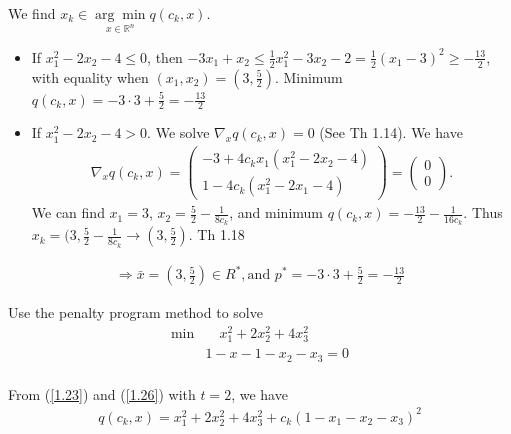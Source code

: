 We find $x_k\in\underset{x\in\mathbb{R}^n}{\arg\min} q(c_k, x)$.
\begin{itemize}
    \item If $x_1^2 - 2x_2 - 4\leqslant 0$, then $-3x_1 + x_2 \leqslant \frac{1}{2}x_1^2 - 3x_2 - 2 = \frac{1}{2}\left(x_1 - 3\right)^2\geqslant -\frac{13}{2}$, with equality when $(x_1, x_2) = (3, \frac{5}{2})$. Minimum $q(c_k, x) = -3\cdot 3 + \frac{5}{2} = -\frac{13}{2}$
    \item If $x_1^2 - 2x_2 - 4>0$. We solve $\nabla_x q(c_k, x) = 0$ (See Th 1.14). We have 
    \begin{align*}
        \nabla_x q(c_k, x) = \left(\begin{array}{c}
             -3+4c_k x_1(x_1^2 - 2x_2 -4)  \\
             1 - 4c_k(x_1^2 - 2x_1 -4)
        \end{array}\right) = \left(\begin{array}{c}
             0  \\
             0 
        \end{array} \right). 
    \end{align*}
    We can find $x_1 = 3$, $x_2 = \frac{5}{2} - \frac{1}{8c_k}$, and minimum $q(c_k, x) = -\frac{13}{2} - \frac{1}{16c_k}$. Thus $x_k = (3, \frac{5}{2} - \frac{1}{8c_k}\to (3, \frac{5}{2})$. Th 1.18
\end{itemize}
\begin{align*}
    \Longrightarrow \bar{x} = (3, \frac{5}{2})\in R^*, \text{and } p^* = -3\cdot 3 + \frac{5}{2} = -\frac{13}{2}
\end{align*}

\begin{example}
    Use the penalty program method to solve
    \begin{align*}
        \min & \quad x_1^2 + 2x_2^2 + 4x_3^2 \\
        & 1-x-1 - x_2 - x_3 = 0\\
    \end{align*}
\end{example}

From (\ref{1.23}) and (\ref{1.26}) with $t=2$, we have
\begin{align*}
    q(c_k, x) = x_1^2 +2x_2^2 + 4x_3^2 + c_k(1 - x_1 - x_2 - x_3)^2
\end{align*}

